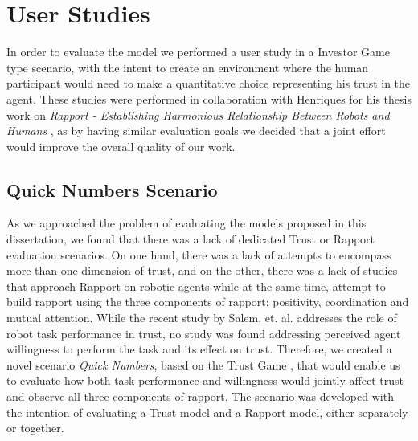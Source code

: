 
\section{User Studies}
\label{sec:UserStudies}

In order to evaluate the model we performed a user study in a Investor Game type scenario, with the intent to create an environment where the human participant would need to make a quantitative choice representing his trust in the agent. These studies were performed in collaboration with Henriques for his thesis work on \textit{Rapport - Establishing Harmonious Relationship Between Robots and Humans} \cite{todo}, as by having similar evaluation goals we decided that a joint effort would improve the overall quality of our work.

\subsection{Quick Numbers Scenario}
\label{subsec:QuickNumbersScenario}

As we approached the problem of evaluating the models proposed in this dissertation, we found that there was a lack of dedicated Trust or Rapport evaluation scenarios. On one hand, there was a lack of attempts to encompass more than one dimension of trust, and on the other, there was a lack of studies that approach Rapport on robotic agents while at the same time, attempt to build rapport using the three components of rapport: positivity, coordination and mutual attention. While the recent study by Salem, et. al.\cite{Salem2015b} addresses the role of robot task performance in trust, no study was found addressing perceived agent willingness to perform the task and its effect on trust. Therefore, we created a novel scenario \emph{Quick Numbers}, based on the Trust Game \cite{JoyceBergJohnDickhaut}, that would enable us to evaluate how both task performance and willingness would jointly affect trust and observe all three components of rapport. The scenario was developed with the intention of evaluating a Trust model and a Rapport model, either separately or together.


